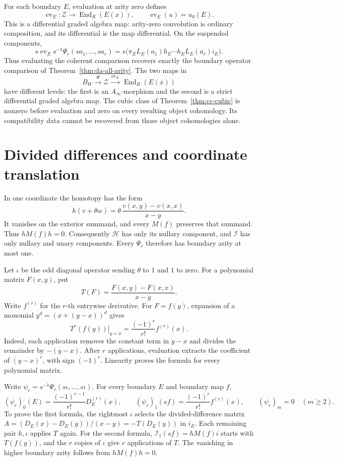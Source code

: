 For each boundary \(E\), evaluation at arity zero defines
\[
 \operatorname{ev}_E:\mathcal Z\longrightarrow
           \operatorname{End}_R(E(x)),\qquad
 \operatorname{ev}_E(u)=u_0(E).
\]
This is a differential graded algebra map: arity-zero
convolution is ordinary composition, and its differential
is the map differential. On the suspended components,
\[
 s\operatorname{ev}_Es^{-1}\Psi_r(sa_1,\ldots,sa_r)
   =s\bigl(\pi_E L_E(a_1)h_E\cdots
                     h_E L_E(a_r)i_E\bigr).
\]
Thus evaluating the coherent comparison recovers exactly the
boundary operator comparison of Theorem~\ref{thm:da-all-arity}.
The two maps in
\[
 B_W\xrightarrow{\ \Psi\ }\mathcal Z
       \xrightarrow{\ \operatorname{ev}_E\ }
                    \operatorname{End}_R(E(x))
\]
have different levels: the first is an \(A_\infty\)-morphism
and the second is a strict differential graded algebra map.
The cubic class of Theorem~\ref{thm:cc-cubic} is nonzero
before evaluation and zero on every resulting object
cohomology. Its compatibility data cannot be recovered
from those object cohomologies alone.

\section{Divided differences and coordinate translation}
\label{sec:mc-translation}

In one coordinate the homotopy has the form
\[
 h(v+\theta w)=\theta\,\frac{v(x,y)-v(x,x)}{x-y}.
\]
It vanishes on the exterior summand, and every \(M(f)\)
preserves that summand. Thus \(hM(f)h=0\).
Consequently \(\mathcal H\) has only its nullary component,
and \(\mathcal I\) has only nullary and unary components.
Every \(\Psi_r\) therefore has boundary arity at most one.

Let \(\iota\) be the odd diagonal operator sending
\(\theta\) to \(1\) and \(1\) to zero.
For a polynomial matrix \(F(x,y)\), put
\[
 T(F)=\frac{F(x,y)-F(x,x)}{x-y}.
\]
Write \(f^{(r)}\) for the \(r\)-th entrywise derivative.
For \(F=f(y)\), expansion of a monomial
\(y^d=(x+(y-x))^d\) gives
\[
 \left.T^r(f(y))\right|_{y=x}
       =\frac{(-1)^r}{r!}f^{(r)}(x).
\]
Indeed, each application removes the constant term in \(y-x\)
and divides the remainder by \(-(y-x)\). After \(r\)
applications, evaluation extracts the coefficient of
\((y-x)^r\), with sign \((-1)^r\). Linearity proves the
formula for every polynomial matrix.

Write \(\psi_r=s^{-1}\Psi_r(s\iota,\ldots,s\iota)\).
For every boundary \(E\) and boundary map \(f\),
\begin{equation}
 (\psi_r)_0(E)=\frac{(-1)^{r-1}}{r!}D_E^{(r)}(x),\qquad
 (\psi_r)_1(sf)=\frac{(-1)^r}{r!}f^{(r)}(x),\qquad
 (\psi_r)_m=0\quad(m\geq2).
 \label{eq:mc-derivatives}
\end{equation}
To prove the first formula, the rightmost \(\iota\) selects
the divided-difference matrix
\(A=(D_E(x)-D_E(y))/(x-y)=-T(D_E(y))\) in \(i_E\).
Each remaining pair \(h,\iota\) applies \(T\) again.
For the second formula, \(\mathcal I_1(sf)=hM(f)i\) starts
with \(T(f(y))\), and the \(r\) copies of \(\iota\) give
\(r\) applications of \(T\). The vanishing in higher
boundary arity follows from \(hM(f)h=0\).

